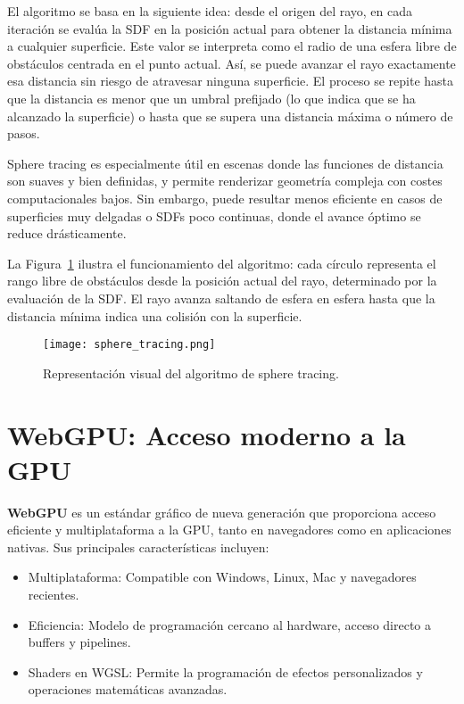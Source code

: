 El algoritmo se basa en la siguiente idea: desde el origen del rayo, en cada
iteración se evalúa la SDF en la posición actual para obtener la distancia
mínima a cualquier superficie. Este valor se interpreta como el radio de una
esfera libre de obstáculos centrada en el punto actual. Así, se puede avanzar
el rayo exactamente esa distancia sin riesgo de atravesar ninguna superficie.
El proceso se repite hasta que la distancia es menor que un umbral prefijado
(lo que indica que se ha alcanzado la superficie) o hasta que se supera una
distancia máxima o número de pasos.

Sphere tracing es especialmente útil en escenas donde las funciones de
distancia son suaves y bien definidas, y permite renderizar geometría compleja
con costes computacionales bajos. Sin embargo, puede resultar menos eficiente
en casos de superficies muy delgadas o SDFs poco continuas, donde el avance
óptimo se reduce drásticamente.

La Figura~\ref{fig:sphere-tracing} ilustra el funcionamiento del algoritmo:
cada círculo representa el rango libre de obstáculos desde la posición actual
del rayo, determinado por la evaluación de la SDF. El rayo avanza saltando de
esfera en esfera hasta que la distancia mínima indica una colisión con la
superficie.

\begin{figure}[H]
    \centering
    \texttt{[image: sphere\_tracing.png]}
    \caption{Representación visual del algoritmo de sphere tracing.}
    \label{fig:sphere-tracing}
\end{figure}

\section{WebGPU: Acceso moderno a la GPU}

\textbf{WebGPU} es un estándar gráfico de nueva generación que proporciona acceso eficiente y multiplataforma a la GPU, tanto en navegadores como en aplicaciones nativas. Sus principales características incluyen:

\begin{itemize}
    \item Multiplataforma: Compatible con Windows, Linux, Mac y navegadores recientes.
    \item Eficiencia: Modelo de programación cercano al hardware, acceso directo a
          buffers y pipelines.
    \item Shaders en WGSL: Permite la programación de efectos personalizados y
          operaciones matemáticas avanzadas.
\end{itemize}

